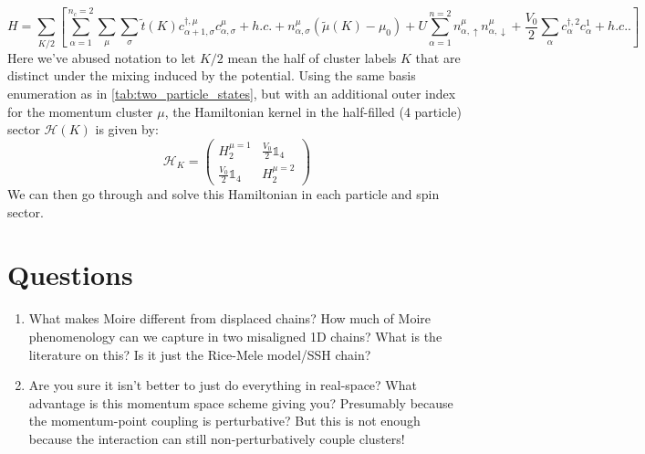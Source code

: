 \documentclass[12pt]{article}
\numberwithin{equation}{section}
\begin{document}
\begin{equation}
\boxed{
    H=\sum_{K/2}
    \left[\sum_{\alpha=1}^{n_c=2}\sum_{\mu}\sum_{\sigma}
    \tilde t(K) c^{\dagger,\mu}_{\alpha+1,\sigma}c^\mu_{\alpha,\sigma}+h.c.
     +n^\mu_{\alpha,\sigma}(\tilde\mu(K)-\mu_0)
    +U\sum_{\alpha=1}^{n=2}n^\mu_{\alpha,\uparrow}n^\mu_{\alpha,\downarrow}
    +\frac{V_0}{2}\sum_{\alpha}c^{\dagger,2}_{\alpha}c^1_\alpha+h.c..
    \right]
}
\end{equation}
Here we've abused notation to let $K/2$ mean the half of cluster labels $K$ that are distinct under the mixing induced by the potential. Using the same basis enumeration as in \cref{tab:two_particle_states}, but with an additional outer index for the momentum cluster $\mu$, the Hamiltonian kernel in the half-filled (4 particle) sector $\mathcal{H}(K)$ is given by:
\begin{equation}
    \mathcal{H}_{K}=
    \begin{pmatrix}
        H^{\mu=1}_{2} & \tfrac{V_0}{2}\mathds{1}_4\\
         \tfrac{V_0}{2}\mathds{1}_4 & H^{\mu=2}_{2}
    \end{pmatrix}
\end{equation}
We can then go through and solve this Hamiltonian in each particle and spin sector. 




\pagebreak
\section{Questions}
\begin{enumerate}
    \item What makes Moire different from displaced chains? How much of Moire phenomenology can we capture in two misaligned 1D chains? What is the literature on this? Is it just the Rice-Mele model/SSH chain?
    \item Are you sure it isn't better to just do everything in real-space? What advantage is this momentum space scheme giving you? Presumably because the momentum-point coupling is perturbative? But this is not enough because the interaction can still non-perturbatively couple clusters!
\end{enumerate}
\end{document}
